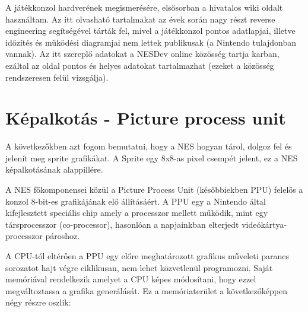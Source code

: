 A játékkonzol hardverének megismerésére, elsősorban a hivatalos wiki oldalt használtam. Az itt olvasható tartalmakat az évek során nagy részt reverse engineering segítségével tárták fel, mivel a játékkonzol pontos adatlapjai, illetve időzítés és működési diagramjai nem lettek publikusak (a Nintendo tulajdonban vannak). Az itt szereplő adatokat a NESDev online közösség tartja karban, ezáltal az oldal pontos és helyes adatokat tartalmazhat (ezeket a közösség rendszeresen felül vizsgálja).   

\section{Képalkotás - Picture process unit}

A következőkben azt fogom bemutatni, hogy a NES hogyan tárol, dolgoz fel és jelenít meg sprite grafikákat. A Sprite egy 8x8-as pixel csempét jelent, ez a NES képalkotásának alappillére.

A NES főkomponensei közül a Picture Process Unit (későbbiekben PPU) felelős a konzol 8-bit-es grafikájának elő állításáért. A PPU egy a Nintendo által kifejlesztett speciális chip amely a processzor mellett működik, mint egy társprocesszor (co-processor), hasonlóan a napjainkban elterjedt videókártya-processzor pároshoz.

A CPU-tól eltérően a PPU egy előre meghatározott grafikus műveleti parancs sorozatot hajt végre ciklikusan, nem lehet közvetlenül programozni. Saját memóriával rendelkezik
amelyet a CPU képes módosítani, hogy ezzel megváltoztassa a grafika generálását. Ez a memóriaterület a következőképpen négy részre oszlik:

